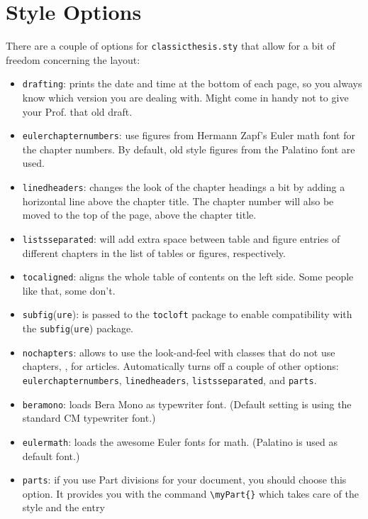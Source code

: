 \section{Style Options}
There are a couple of options for \texttt{classicthesis.sty} that
allow for a bit of freedom concerning the layout:
\begin{itemize}
    \item\texttt{drafting}: prints the date and time at the bottom of
    each page, so you always know which version you are dealing with.
    Might come in handy not to give your Prof. that old draft.
    \item\texttt{eulerchapternumbers}: use figures from Hermann Zapf's
    Euler math font for the chapter numbers. By default, old style
    figures from the Palatino font are used.
    \item\texttt{linedheaders}: changes the look of the chapter
    headings a bit by adding a horizontal line above the chapter
    title. The chapter number will also be moved to the top of the
    page, above the chapter title.
    \item\texttt{listsseparated}: will add extra space between table
    and figure entries of different chapters in the list of tables or
    figures, respectively.
    \item\texttt{tocaligned}: aligns the whole table of contents on
    the left side. Some people like that, some don't.
    \item\texttt{subfig}(\texttt{ure}): is passed to the \texttt{tocloft} 
    package to enable compatibility with the \texttt{subfig}(\texttt{ure}) 
    package.
    \item\texttt{nochapters}: allows to use the look-and-feel with 
    classes that do not use chapters, \eg, for articles. Automatically
    turns off a couple of other options: \texttt{eulerchapternumbers}, 
    \texttt{linedheaders}, \texttt{listsseparated}, and \texttt{parts}.
    \item\texttt{beramono}: loads Bera Mono as typewriter font. 
    (Default setting is using the standard CM typewriter font.)
    \item\texttt{eulermath}: loads the awesome Euler fonts for math. 
    (Palatino is used as default font.)
    \item\texttt{parts}: if you use Part divisions for your document,
    you should choose this option. It provides you with the command
    \verb|\myPart{}| which takes care of the style and the entry

\end{itemize}
